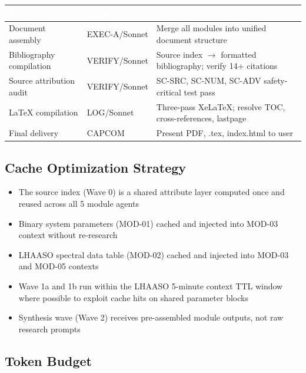 \documentclass[11pt,letterpaper]{article}
\newcommand{\tableheader}[1]{\textbf{\sffamily\textcolor{white}{#1}}}
\begin{document}
\begin{center}
\begin{tabularx}{\textwidth}{L{3.5cm}L{2cm}X}
\toprule
{}
\tableheader{Task} & \tableheader{Agent} & \tableheader{Description} \\
\midrule
Document assembly & EXEC-A/Sonnet & Merge all modules into unified document structure \\
Bibliography compilation & VERIFY/Sonnet & Source index $\to$ formatted bibliography; verify 14+ citations \\
Source attribution audit & VERIFY/Sonnet & SC-SRC, SC-NUM, SC-ADV safety-critical test pass \\
LaTeX compilation & LOG/Sonnet & Three-pass XeLaTeX; resolve TOC, cross-references, lastpage \\
Final delivery & CAPCOM & Present PDF, .tex, index.html to user \\
\bottomrule
\end{tabularx}
\end{center}

\subsection{Cache Optimization Strategy}

\begin{itemize}[noitemsep]
  \item The source index (Wave 0) is a shared attribute layer computed once and reused across all 5 module agents
  \item Binary system parameters (MOD-01) cached and injected into MOD-03 context without re-research
  \item LHAASO spectral data table (MOD-02) cached and injected into MOD-03 and MOD-05 contexts
  \item Wave 1a and 1b run within the LHAASO 5-minute context TTL window where possible to exploit cache hits on shared parameter blocks
  \item Synthesis wave (Wave 2) receives pre-assembled module outputs, not raw research prompts
\end{itemize}

\subsection{Token Budget}
\end{document}
